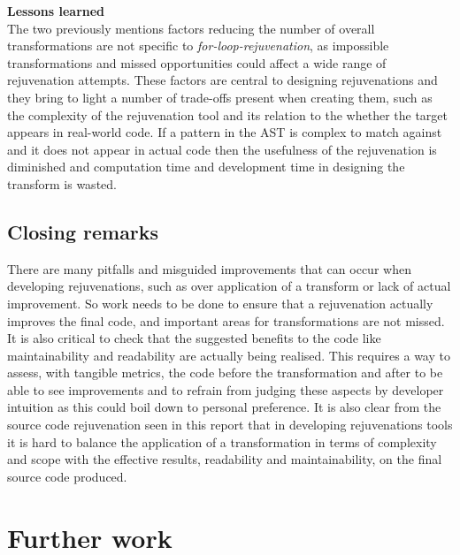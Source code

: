 \documentclass[bsc,frontabs,singlespacing,twoside,parskip,deptreport]{infthesis}
\begin{document}
\textbf{Lessons learned}\\
The two previously mentions factors reducing the number of overall transformations are not specific to \textit{for-loop-rejuvenation}, as impossible transformations and missed opportunities could affect a wide range of rejuvenation attempts. These factors are central to designing rejuvenations and they bring to light a number of trade-offs present when creating them, such as the complexity of the rejuvenation tool and its relation to the whether the target appears in real-world code. If a pattern in the AST is complex to match against and it does not appear in actual code then the usefulness of the rejuvenation is diminished and computation time and development time in designing the transform is wasted. 


\subsection{Closing remarks}
There are many pitfalls and misguided improvements that can occur when developing rejuvenations, such as over application of a transform or lack of actual improvement. So work needs to be done to ensure that a rejuvenation actually improves the final code, and important areas for transformations are not missed. It is also critical to check that the suggested benefits to the code like maintainability and readability are actually being realised. This requires a way to assess, with tangible metrics, the code before the transformation and after to be able to see improvements and to refrain from judging these aspects by developer intuition as this could boil down to personal preference. It is also clear from the source code rejuvenation seen in this report that in developing rejuvenations tools it is hard to balance the application of a transformation in terms of complexity and scope with the effective results, readability and maintainability, on the final source code produced. 


\section{Further work}
\end{document}
